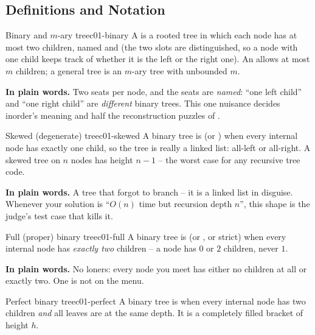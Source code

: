 \subsection{Definitions and Notation}

\begin{definition}{Binary and $m$-ary tree}{c01-binary}
A  is a rooted tree in which each node has at most two children, named
 and  (the two slots are distinguished, so a node with one child
keeps track of whether it is the left or the right one). An  allows at
most $m$ children; a general tree is an $m$-ary tree with unbounded $m$.
\end{definition}

\noindent\textbf{In plain words.} Two seats per node, and the seats are \emph{named}:
``one left child'' and ``one right child'' are \emph{different} binary trees. This one
nuisance decides inorder's meaning and half the reconstruction puzzles of .

\begin{definition}{Skewed (degenerate) tree}{c01-skewed}
A binary tree is  (or ) when every internal node has exactly
one child, so the tree is really a linked list: all-left or all-right. A skewed tree on $n$
nodes has height $n-1$ -- the worst case for any recursive tree code.
\end{definition}

\noindent\textbf{In plain words.} A tree that forgot to branch -- it is a linked list in
disguise. Whenever your solution is ``$O(n)$ time but recursion depth $n$'', this shape
is the judge's test case that kills it.

\begin{definition}{Full (proper) binary tree}{c01-full}
A binary tree is  (or , or strict) when every internal node has
\emph{exactly two} children -- a node has $0$ or $2$ children, never $1$.
\end{definition}

\noindent\textbf{In plain words.} No loners: every node you meet has either no children
at all or exactly two. One is not on the menu.

\begin{definition}{Perfect binary tree}{c01-perfect}
A binary tree is  when every internal node has two children \emph{and} all
leaves are at the same depth. It is a completely filled bracket of height $h$.
\end{definition}

